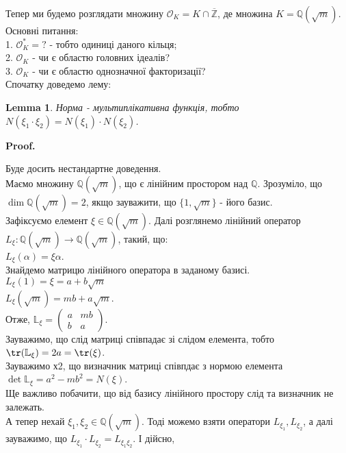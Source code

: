 \documentclass[a4paper, 14pt]{extarticle}
\makeatletter
\theoremstyle{theoremdd}
\theoremstyle{theoremdd}
\theoremstyle{theoremdd}
\theoremstyle{theoremdd}
\theoremstyle{theoremdd}
\theoremstyle{theoremdd}
\theoremstyle{theoremdd}
\newtheorem{lemma}[theorem]{Lemma}
\theoremstyle{theoremdd}
\def\qed{$\blacksquare$}
\renewenvironment{proof}[1][Proof.\\]{\par
\pushQED{\hfill \qed}%
\normalfont \topsep6\p@\@plus6\p@\relax
\trivlist
\item\relax
{\bfseries
#1\@addpunct{.}}\hspace\labelsep\ignorespaces
}{%
\popQED\endtrivlist\@endpefalse
}
\makeatother
\begin{document}
Тепер ми будемо розглядати множину $\mathcal{O}_K = K \cap \overline{\mathbb{Z}}$, де множина $K = \mathbb{Q}(\sqrt{m})$.\\
Основні питання:\\
1. $\mathcal{O}^*_K = ?$ - тобто одиниці даного кільця;\\
2. $\mathcal{O}_K$ - чи є областю головних ідеалів?\\
3. $\mathcal{O}_K$ - чи є областю однозначної факторизації?
\bigskip \\
Спочатку доведемо лему:
\begin{lemma}
Норма - мультиплікативна функція, тобто\\
$N(\xi_1 \cdot \xi_2) = N(\xi_1) \cdot N(\xi_2)$.
\end{lemma}

\begin{proof}
Буде досить нестандартне доведення.\\
Маємо множину $\mathbb{Q}(\sqrt{m})$, що є лінійним простором над $\mathbb{Q}$. Зрозуміло, що $\dim \mathbb{Q}(\sqrt{m}) = 2$, якщо зауважити, що $\{1, \sqrt{m}\}$ - його базис.\\
Зафіксуємо елемент $\xi \in \mathbb{Q}(\sqrt{m})$. Далі розглянемо лінійний оператор $L_\xi: \mathbb{Q}(\sqrt{m}) \to \mathbb{Q}(\sqrt{m})$, такий, що:\\
$L_\xi(\alpha) = \xi \alpha$.\\
Знайдемо матрицю лінійного оператора в заданому базисі.\\
$L_\xi(1) = \xi = a + b \sqrt{m}$\\
$L_\xi(\sqrt{m}) = mb + a\sqrt{m}$.\\
Отже, $\mathbb{L}_\xi = \begin{pmatrix}
a & mb \\
b & a
\end{pmatrix}$.\\
Зауважимо, що слід матриці співпадає зі слідом елемента, тобто\\
$\tr (\mathbb{L}_\xi) = 2a = \tr(\xi)$.\\
Зауважимо х2, що визначник матриці співпдає з нормою елемента\\
$\det \mathbb{L}_\xi = a^2 - mb^2 = N(\xi)$.\\
Ще важливо побачити, що від базису лінійного простору слід та визначник не залежать.\\
А тепер нехай $\xi_1,\xi_2 \in \mathbb{Q}(\sqrt{m})$. Тоді можемо взяти оператори $L_{\xi_1}, L_{\xi_2}$, а далі зауважимо, що $L_{\xi_1} \cdot L_{\xi_2} = L_{\xi_1 \xi_2}$. І дійсно,\\

\end{proof}
\end{document}

